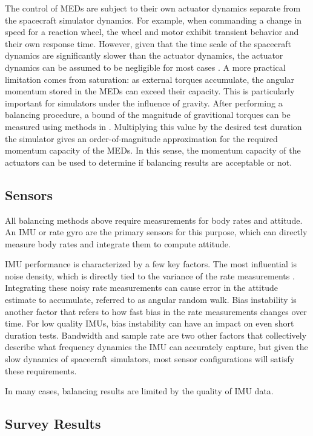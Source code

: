 The control of MEDs are subject to their own actuator dynamics separate from the spacecraft simulator dynamics. For example, when commanding a change in speed for a reaction wheel, the wheel and motor exhibit transient behavior and their own response time. However, given that the time scale of the spacecraft dynamics are significantly slower than the actuator dynamics, the actuator dynamics can be assumed to be negligible for most cases \cite{kristiansen_modelling_2009}. A more practical limitation comes from saturation: as external torques accumulate, the angular momentum stored in the MEDs can exceed their capacity. This is particularly important for simulators under the influence of gravity. After performing a balancing procedure, a bound of the magnitude of gravitional torques can be measured using methods in . Multiplying this value by the desired test duration the simulator gives an order-of-magnitude approximation for the required momentum capacity of the MEDs. In this sense, the momentum capacity of the actuators can be used to determine if balancing results are acceptable or not.

\subsection{Sensors}

All balancing methods above require measurements for body rates and attitude. An IMU or rate gyro are the primary sensors for this purpose, which can directly measure body rates and integrate them to compute attitude. 

IMU performance is characterized by a few key factors. The most influential is noise density, which is directly tied to the variance of the rate measurements \cite{unsal_estimation_2012}. Integrating these noisy rate measurements can cause error in the attitude estimate to accumulate, referred to as angular random walk. Bias instability is another factor that refers to how fast bias in the rate measurements changes over time. For low quality IMUs, bias instability can have an impact on even short duration tests. Bandwidth and sample rate are two other factors that collectively describe what frequency dynamics the IMU can accurately capture, but given the slow dynamics of spacecraft simulators, most sensor configurations will satisfy these requirements.

In many cases, balancing results are limited by the quality of IMU data. 

\subsection{Survey Results}


